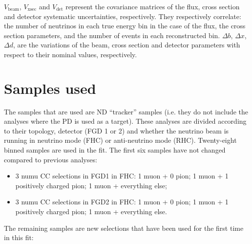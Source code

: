 $V_\text{beam}$, $V_\text{xsec}$ and $V_\text{det}$ represent the
covariance matrices of the flux, cross section and detector systematic
uncertainties, respectively. They respectively correlate: the number
of neutrinos in each true energy bin in the case of the flux, the
cross section parameters, and the number of events in each
reconstructed bin. $\Delta b$, $\Delta x$, $\Delta d$, are the
variations of the beam, cross section and detector parameters with
respect to their nominal values, respectively.

\section{Samples used}
\label{sec:samples}
The samples that are used are \Gls{ND} ``tracker'' samples (i.e. they
do not include the analyses where the \Gls{PD} is used as a
target). These analyses are divided according to their topology,
detector (\Gls{FGD} 1 or 2) and whether the neutrino beam is running
in neutrino mode (\Gls{FHC}) or anti-neutrino mode
(\Gls{RHC}). Twenty-eight binned samples are used in the fit. The
first six samples have not changed compared to previous analyses:
\begin{itemize}[noitemsep,topsep=0pt]
\item 3 \Gls{numu} \Gls{CC} selections in \Gls{FGD}1 in \Gls{FHC}: 1
  muon + 0 pion; 1 muon + 1 positively charged pion; 1 muon +
  everything else;
\item 3 \Gls{numu} \Gls{CC} selections in \Gls{FGD}2 in \Gls{FHC}: 1
  muon + 0 pion; 1 muon + 1 positively charged pion; 1 muon +
  everything else.
\end{itemize}
The remaining samples are new selections that have been used for the
first time in this fit:
